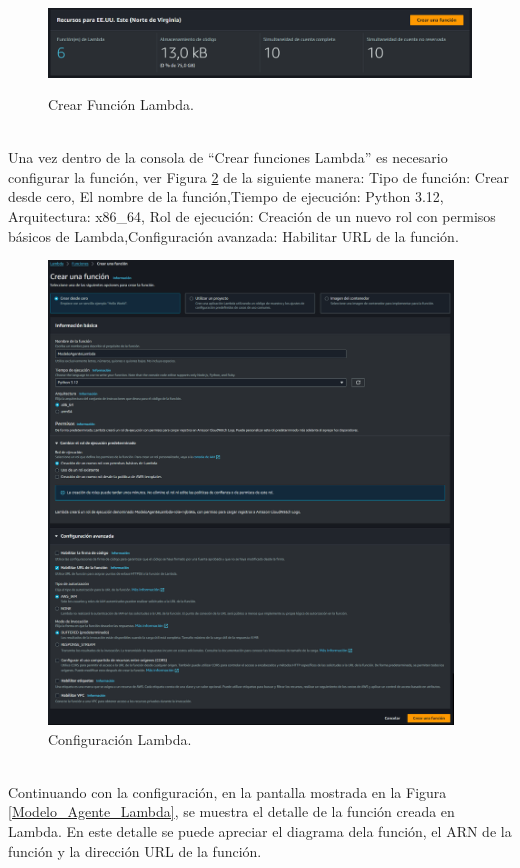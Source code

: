 \documentclass[a4paper,10pt, oneside, titlepage]{article}
\begin{document}
	\begin{figure}[!h]
		\centering
		\includegraphics[width = 1\linewidth, height = 2.5cm]{Crear_Lambda.png}
		\caption{Crear Función Lambda.}
		\label{Crear_Lambda}
	\end{figure} \\
	\indent Una vez dentro de la consola de  ``Crear funciones Lambda'' es necesario configurar la función, ver Figura \ref{Configuracion_Lambda} de la siguiente manera: Tipo de función: Crear desde cero, El nombre de la función,Tiempo de ejecución: Python 3.12, Arquitectura: x86\_64, Rol de ejecución: Creación de un nuevo rol con permisos básicos de Lambda,Configuración avanzada: Habilitar URL de la función.
	\begin{figure}[!h]
		\centering
		\includegraphics[width = 1\linewidth, height = 12.3cm]{Configuracion_Lambda.png}
		\caption{Configuración Lambda.}
		\label{Configuracion_Lambda}
	\end{figure} \\
	\indent Continuando con la configuración, en la pantalla mostrada en la Figura \ref{Modelo_Agente_Lambda}, se muestra el detalle de la función creada en Lambda. En este detalle se puede apreciar el diagrama dela función, el ARN de la función y la dirección URL de la función.
\end{document}
